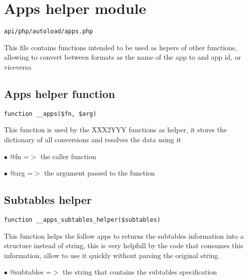 \documentclass[a4paper]{book}
\begin{document}
\hypertarget{toc21}{}
\section{Apps helper module}

\begin{lstlisting}
api/php/autoload/apps.php
\end{lstlisting}

This file contains functions intended to be used as hepers of other functions, allowing to convert
between formats as the name of the app to and app id, or viceversa

\hypertarget{toc22}{}
\subsection{Apps helper function}

\begin{lstlisting}
function __apps($fn, $arg)
\end{lstlisting}

This function is used by the XXX2YYY functions as helper, it stores the
dictionary of all conversions and resolves the data using it

\begin{compactitem}
\item[\color{myblue}$\bullet$] @fn  =$>$ the caller function
\item[\color{myblue}$\bullet$] @arg =$>$ the argument passed to the function
\end{compactitem}

\hypertarget{toc23}{}
\subsection{Subtables helper}

\begin{lstlisting}
function __apps_subtables_helper($subtables)
\end{lstlisting}

This function helps the follow apps to returns the subtables information into
a structure instead of string, this is very helpfull by the code that consumes
this information, allow to use it quickly without parsing the original string.

\begin{compactitem}
\item[\color{myblue}$\bullet$] @subtables =$>$ the string that contains the subtables specification
\end{compactitem}
\end{document}
